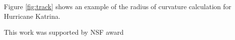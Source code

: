 \documentclass[wcd,manuscript]{copernicus}
\begin{document}
Figure \ref{fig:track} shows an example of the radius of curvature calculation for Hurricane Katrina. 






\noappendix       %










\begin{acknowledgements}
This work was supported by NSF award 
\end{acknowledgements}






\end{document}
